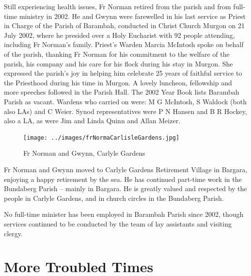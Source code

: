 Still experiencing health issues, Fr Norman retired from the parish and from full-time ministry in 2002. He and Gwynn were farewelled in his last service as Priest in Charge of the Parish of Barambah, conducted in Christ Church Murgon on 21 July 2002, where he presided over a Holy Eucharist with 92 people attending, including Fr Norman's family. Priest's Warden Marcia McIntosh spoke on behalf of the parish, thanking Fr Norman for his commitment to the welfare of the parish, his company and his care for his flock during his stay in Murgon. She expressed the parish's joy in helping him celebrate 25 years of faithful service to the Priesthood during his time in Murgon. A lovely luncheon, fellowship and more speeches followed in the Parish Hall. The 2002 Year Book lists Barambah Parish as vacant. Wardens who carried on were: M G McIntosh, S Waldock (both also LAs) and C Weier. Synod representatives were P N Hansen and B R Hockey, also a LA, as were Jim and Linda Quinn and Allan Meizer.









\begin{figure}
\begin{center}
\texttt{[image: ../images/frNormaCarlisleGardens.jpg]}
\caption{Fr Norman and Gwynn, Carlyle Gardens}
\end{center}
\end{figure}




Fr Norman and Gwynn moved to Carlyle Gardens Retirement Village in Bargara, enjoying a happy retirement by the sea. He has continued part-time work in the Bundaberg Parish -- mainly in Bargara. He is greatly valued and respected by the people in Carlyle Gardens, and in church circles in the Bundaberg Parish.



No full-time minister has been employed in Barambah Parish since 2002, though services continued to be conducted by the team of lay assistants and visiting clergy.



\balance


\printendnotes[custom]
\setcounter{endnote}{0}
\chapter{More Troubled Times}
\nobalance


